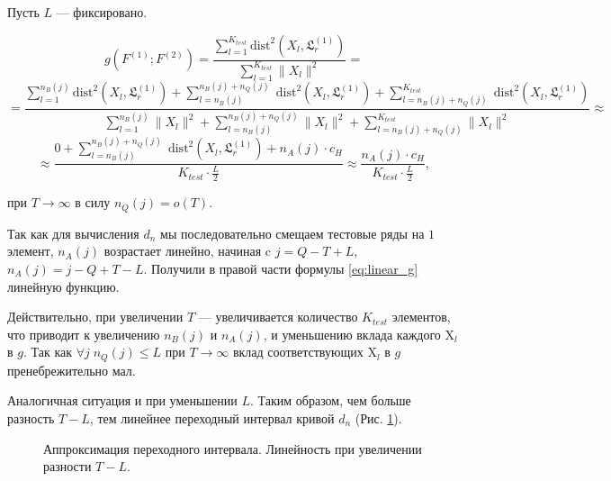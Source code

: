 \documentclass[specialist, substylefile = spbu.rtx,
			   subf, href, 12pt]{disser}
\begin{document}
Пусть $ L $ --- фиксировано. 

$$ g(F^{(1)}; F^{(2)}) = \frac{\sum\limits_{l=1}^{K_{test}}\mathrm{dist}^2(X_l, \mathfrak{L}_r^{(1)})}{\sum\limits_{l=1}^{K_{test}}\|X_l\|^2} = $$
$$ = \frac{\sum\limits_{l=1}^{n_B(j)}\mathrm{dist}^2(X_l, \mathfrak{L}_r^{(1)}) + \sum\limits_{l=n_B(j)}^{n_B(j) + n_Q(j)}\;\mathrm{dist}^2(X_l, \mathfrak{L}_r^{(1)}) + \sum\limits_{l=n_B(j) + n_Q(j)}^{K_{test}}\;\mathrm{dist}^2(X_l, \mathfrak{L}_r^{(1)})}{\sum\limits_{l=1}^{n_B(j)}\|X_l\|^2 + \sum\limits_{l=n_B(j)}^{n_B(j)+n_Q(j)}\|X_l\|^2 + \sum\limits_{l=n_B(j)+n_Q(j)}^{K_{test}}\|X_l\|^2} \approx $$
\begin{equation}\label{eq:linear_g}
	\approx \frac{0 + \sum\limits_{l=n_B(j)}^{n_B(j)+n_Q(j)}\;\mathrm{dist}^2(X_l, \mathfrak{L}_r^{(1)}) + n_A(j) \cdot c_H}{K_{test}\cdot \frac{L}{2}} \approx \frac{n_A(j) \cdot c_H}{K_{test}\cdot \frac{L}{2}},
\end{equation}

при $ T \rightarrow \infty $ в силу $ n_Q(j) = o(T) $.

Так как для вычисления $ d_n $ мы последовательно смещаем тестовые ряды на $ 1 $ элемент, $ n_A(j) $ возрастает линейно, начиная c $ j = Q-T+L $, $ n_A(j) = j - Q + T - L $. Получили в правой части формулы \eqref{eq:linear_g} линейную функцию. 

Действительно, при увеличении $ T $ --- увеличивается количество $ K_{test} $ элементов, что приводит к увеличению $ n_B(j) $ и $ n_A(j) $, и уменьшению вклада каждого $ \mathrm{X}_l $ в $ g $. Так как $ \forall j \; n_Q(j) \leq L $ при $ T \rightarrow \infty $ вклад соответствующих $ \mathrm{X}_l $ в $ g $ пренебрежительно мал.

Аналогичная ситуация и при уменьшении $ L $. Таким образом, чем больше разность $ T-L $, тем линейнее переходный интервал кривой $ d_n $ (Рис. \ref{pic:row_linear_growth}).


\begin{figure}[!hhh]
	\caption{Аппроксимация переходного интервала. Линейность при увеличении разности $ T-L $.}
	\label{pic:row_linear_growth}
\end{figure}
\end{document}
